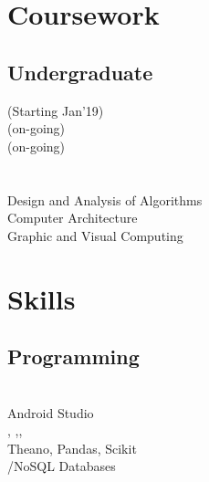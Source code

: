 \documentclass[]{deedy-resume-openfont}
\begin{document}
\begin{minipage}[t]{0.33\textwidth}

\section{Coursework}

\subsection{Undergraduate}
 (Starting Jan'19) \\
 (on-going) \\
 (on-going) \\
\\
 \\
Design and Analysis of Algorithms\\
Computer Architecture\\
Graphic and Visual Computing \\
\sectionsep


\section{Skills}
\subsection{Programming}
 \textbullet{}    \textbullet{}  \textbullet{}  \\
 \textbullet{}  \textbullet{} Android Studio \\
, ,,\\ Theano, Pandas, Scikit\\
 \textbullet{}  \textbullet{} \textbullet{} \custombold{\LaTeX} \textbullet{} /NoSQL Databases
\sectionsep

%
%

\end{minipage} 
\end{document}
